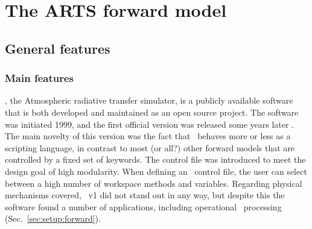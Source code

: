 \chapter{The ARTS forward model}
\label{chapter:arts}


\section{General features}
\label{sec:arts:features}

\subsection{Main features}
%
\ARTS, the Atmospheric radiative transfer simulator, is a publicly available
software that is both developed and maintained as an open source project. The
software was initiated 1999, and the first official version was released some
years later \citep{buehler:artst:05}. The main novelty of this version was the
fact that \ARTS\ behaves more or less as a scripting language, in contrast to
most (or all?) other forward models that are controlled by a fixed set of
keywords. The control file was introduced to meet the design goal of high
modularity. When defining an \ARTS\ control file, the user can select between a
high number of workspace methods and variables. Regarding physical mechanisms
covered, \ARTS\ v1 did not stand out in any way, but despite this the software
found a number of applications, including operational \SMR\ processing
(Sec.~\ref{sec:setup:forward}).

